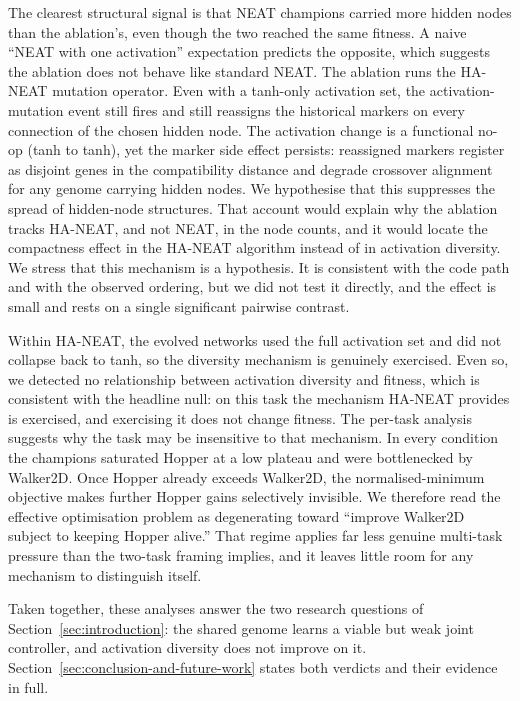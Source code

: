 \documentclass[12pt]{article}
\newcommand{\revGram}[2]{#2}
\newcommand{\revPlain}[2]{#2}
\newcommand{\revBrit}[2]{#2}
\begin{document}
The clearest structural signal is that NEAT champions carried more hidden nodes than the ablation's, even though the two reached the same fitness.
A naive ``NEAT with one activation'' expectation predicts the opposite, which suggests the ablation does not behave like standard NEAT.
The ablation runs the HA-NEAT mutation operator.
Even with a tanh-only activation set, the activation-mutation event still fires and still reassigns the historical markers on every connection of the chosen hidden node.
The activation change is a functional no-op (tanh to tanh), yet the marker side effect persists: reassigned markers register as disjoint genes in the compatibility distance and degrade crossover alignment for any genome carrying hidden nodes.
\revBrit{E-12}{We hypothesise that this} suppresses the spread of hidden-node structures.
That account would explain why the ablation tracks HA-NEAT, and not NEAT, in the node counts, and it would locate the compactness effect in the HA-NEAT algorithm instead of in activation diversity.
We stress that this mechanism is a hypothesis.
It is consistent with the code path and with the observed ordering, but we did not test it directly, and the effect is small and rests on a single significant pairwise contrast.

Within HA-NEAT, the evolved networks used the full activation set and did not collapse back to tanh, so the diversity mechanism is genuinely exercised.
Even so, we detected no relationship between activation diversity and fitness, which is consistent with the headline null: on this task \revPlain{P-05}{the mechanism HA-NEAT provides is exercised, and exercising it does not change fitness}.
The per-task analysis suggests why the task may be insensitive to that mechanism.
In every condition the champions saturated Hopper at a low plateau and were bottlenecked by Walker2D.
Once Hopper already exceeds Walker2D, the normalised-minimum objective makes further Hopper gains selectively invisible.
We therefore read \revBrit{E-13}{the effective optimisation problem} as degenerating toward ``improve Walker2D subject to keeping Hopper alive.''
\revGram{G-09}{That regime applies far less genuine multi-task pressure} than the two-task framing implies, and it leaves little room for any mechanism to distinguish itself.

Taken together, these analyses answer the two research questions of Section~\ref{sec:introduction}: the shared genome learns a viable but weak joint controller, and activation diversity does not improve on it.
Section~\ref{sec:conclusion-and-future-work} states both verdicts and their evidence in full.
\end{document}
